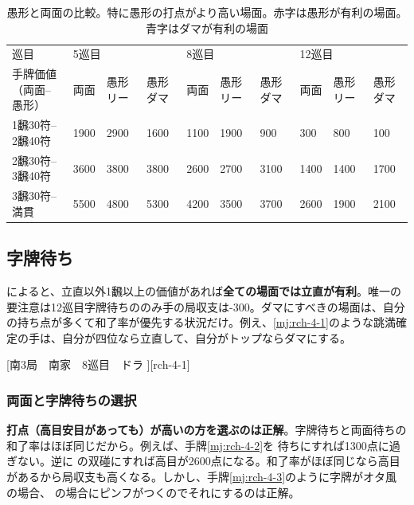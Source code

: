 \documentclass[10pt, twocolumn]{article}
\begin{document}
\begin{table}[t]
  \centering
  \begin{tabular}{l|lllllllll}
    巡目       & \multicolumn{3}{l}{5巡目} & \multicolumn{3}{l}{8巡目} & \multicolumn{3}{l}{12巡目} \\
    手牌価値（両面--愚形）& 両面 & 愚形リー & 愚形ダマ & 両面 & 愚形リー & 愚形ダマ & 両面 & 愚形リー & 愚形ダマ \\
    \hline
    1飜30符--2飜40符    & {\color{red}1900} & {\color{red}2900} & {\color{red}1600} & {\color{red}1100} & {\color{red}1900} & {\color{red}900} & {\color{red}300} & {\color{red}800} & {\color{red}100} \\
    2飜30符--3飜40符    & 3600 & 3800 & 3800 & {\color{blue}2600} & {\color{blue}2700} & {\color{blue}3100} & {\color{blue}1400} & {\color{blue}1400} & {\color{blue}1700} \\
    3飜30符--満貫       & 5500 & 4800 & 5300 & 4200 & 3500 & 3700 & 2600 & 1900 & 2100 \\
  \end{tabular}
  \caption{愚形と両面の比較。特に愚形の打点がより高い場面。赤字は愚形が有利の場面。青字はダマが有利の場面}
  \label{tab:ev-ryanmen-gukei-compare}
\end{table}


\subsection{字牌待ち}

\citet[p. 46]{miinin-stat}によると、立直以外1飜以上の価値があれば\textbf{全ての場面では立直が有利}。唯一の要注意は12巡目字牌待ちののみ手の局収支は-300。ダマにすべきの場面は、自分の持ち点が多くて和了率が優先する状況だけ。例え、\ref{mj:rch-4-1}のような跳満確定の手は、自分が四位なら立直して、自分がトップならダマにする。

[南3局　南家　8巡目　ドラ ][rch-4-1]

\subsubsection*{両面と字牌待ちの選択} 

\textbf{打点（高目安目があっても）が高いの方を選ぶのは正解}\citep[][p.50]{miinin-stat}。字牌待ちと両面待ちの和了率はほぼ同じだから。例えば、手牌\ref{mj:rch-4-2}を  待ちにすれば1300点に過ぎない。逆に  の双碰にすれば高目が2600点になる。和了率がほぼ同じなら高目があるから局収支も高くなる。しかし、手牌\ref{mj:rch-4-3}のように字牌がオタ風の場合、 の場合にピンフがつくのでそれにするのは正解。
\end{document}
